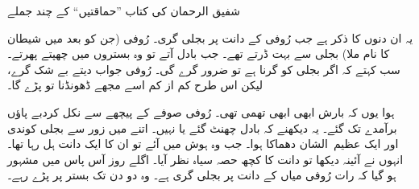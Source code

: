 \documentclass{article}
\begin{document}

   \begin{center} \Large          %
      شفیق الرحمان کی کتاب ''حماقتیں`` کے چند جملے
   \end{center}
   \vspace{2\baselineskip}    %

   یہ ان دنوں کا ذکر ہے جب رُوفی کے دانت پر بجلی گری۔ رُوفی (جن کو بعد میں شیطان کا نام ملا) بجلی سے بہت ڈرتے تھے۔ جب بادل آتے تو وہ بستروں میں چھپتے پھرتے۔ سب کہتے کہ اگر بجلی کو گرنا ہے تو ضرور گرے گی۔ رُوفی جواب دیتے بے شک گرے، لیکن اس طرح کم از کم اسے مجھے ڈھونڈنا تو پڑے گا۔
   
   ہوا یوں کہ بارش ابھی ابھی تھمی تھی۔ رُوفی صوفے کے پیچھے سے نکل کردبے پاؤں برآمدے تک گئے۔ یہ دیکھنے کہ بادل چھنٹ گئے یا نہیں۔ اتنے میں زور سے بجلی کوندی اور ایک \hbox{عظیم الشان} دھماکا ہوا۔ جب وہ ہوش میں آئے تو ان کا ایک دانت ہل رہا تھا۔ انہوں نے آئینہ دیکھا تو دانت کا کچھ حصہ سیاہ نظر آیا۔ اگلے روز آس پاس میں مشہور ہو گیا کہ رات رُوفی میاں کے دانت پر بجلی گری ہے۔ وہ دو دن تک بستر پر پڑے رہے۔
\end{document}
